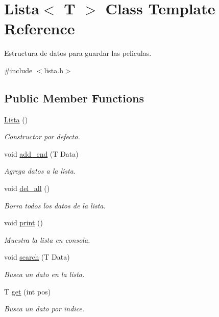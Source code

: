 \hypertarget{classLista}{}\section{Lista$<$ T $>$ Class Template Reference}
\label{classLista}


Estructura de datos para guardar las peliculas.  




{\ttfamily \#include $<$lista.\+h$>$}

\subsection*{Public Member Functions}
\begin{DoxyCompactItemize}
\item 
\mbox{\label{classLista_adce924e21607848663132290be1a959d}} 
\hyperlink{classLista_adce924e21607848663132290be1a959d}{Lista} ()
\begin{DoxyCompactList}\small\item\em Constructor por defecto. \end{DoxyCompactList}\item 
void \hyperlink{classLista_a48b79118586cc9e1984472cccaee272c}{add\+\_\+end} (T Data)
\begin{DoxyCompactList}\small\item\em Agrega datos a la lista. \end{DoxyCompactList}\item 
\mbox{\label{classLista_ae30265805a9c1656ad74e1caefb49483}} 
void \hyperlink{classLista_ae30265805a9c1656ad74e1caefb49483}{del\+\_\+all} ()
\begin{DoxyCompactList}\small\item\em Borra todos los datos de la lista. \end{DoxyCompactList}\item 
\mbox{\label{classLista_ac518d2c9eb4c1f24adc0f847b86767f2}} 
void \hyperlink{classLista_ac518d2c9eb4c1f24adc0f847b86767f2}{print} ()
\begin{DoxyCompactList}\small\item\em Muestra la lista en consola. \end{DoxyCompactList}\item 
void \hyperlink{classLista_a8539edb8abc0d862bdd366169f277ca0}{search} (T Data)
\begin{DoxyCompactList}\small\item\em Busca un dato en la lista. \end{DoxyCompactList}\item 
T \hyperlink{classLista_acbab7f54b31ec1de68d13e02b3d265da}{get} (int pos)
\begin{DoxyCompactList}\small\item\em Busca un dato por indice. \end{DoxyCompactList}\end{DoxyCompactItemize}
